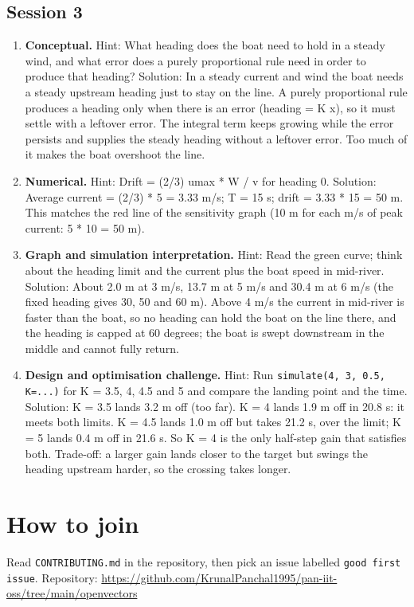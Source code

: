 \documentclass[11pt,a4paper]{article}
\begin{document}
\subsection*{Session 3}
\begin{enumerate}[nosep]
\item \textbf{Conceptual.} Hint: What heading does the boat need to hold in a steady wind, and what error does a purely proportional rule need in order to produce that heading? Solution: In a steady current and wind the boat needs a steady upstream heading just to stay on the line. A purely proportional rule produces a heading only when there is an error (heading = K x), so it must settle with a leftover error. The integral term keeps growing while the error persists and supplies the steady heading without a leftover error. Too much of it makes the boat overshoot the line.
\item \textbf{Numerical.} Hint: Drift = (2/3) umax * W / v for heading 0. Solution: Average current = (2/3) * 5 = 3.33 m/s; T = 15 s; drift = 3.33 * 15 = 50 m. This matches the red line of the sensitivity graph (10 m for each m/s of peak current: 5 * 10 = 50 m).
\item \textbf{Graph and simulation interpretation.} Hint: Read the green curve; think about the heading limit and the current plus the boat speed in mid-river. Solution: About 2.0 m at 3 m/s, 13.7 m at 5 m/s and 30.4 m at 6 m/s (the fixed heading gives 30, 50 and 60 m). Above 4 m/s the current in mid-river is faster than the boat, so no heading can hold the boat on the line there, and the heading is capped at 60 degrees; the boat is swept downstream in the middle and cannot fully return.
\item \textbf{Design and optimisation challenge.} Hint: Run \texttt{simulate(4, 3, 0.5, K=...)} for K = 3.5, 4, 4.5 and 5 and compare the landing point and the time. Solution: K = 3.5 lands 3.2 m off (too far). K = 4 lands 1.9 m off in 20.8 s: it meets both limits. K = 4.5 lands 1.0 m off but takes 21.2 s, over the limit; K = 5 lands 0.4 m off in 21.6 s. So K = 4 is the only half-step gain that satisfies both. Trade-off: a larger gain lands closer to the target but swings the heading upstream harder, so the crossing takes longer.
\end{enumerate}

\section{How to join}
Read \texttt{CONTRIBUTING.md} in the repository, then pick an issue labelled \texttt{good first issue}. Repository: \url{https://github.com/KrunalPanchal1995/pan-iit-oss/tree/main/openvectors}
\end{document}
